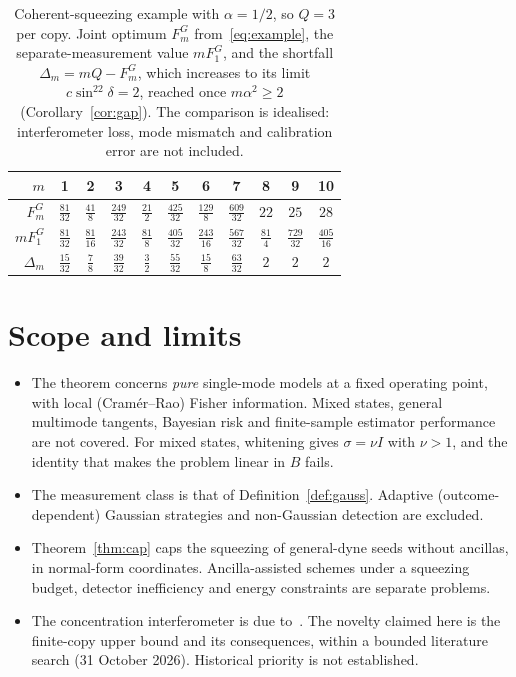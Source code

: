 \documentclass[11pt,a4paper]{article}
\theoremstyle{definition}\newtheorem{definition}{Definition}
\theoremstyle{remark}\newtheorem{remark}{Remark}
\begin{document}
\begin{table}[ht]
\centering
\caption{Coherent-squeezing example with $\alpha=1/2$, so $Q=3$ per copy. Joint optimum $F_m^G$ from~\eqref{eq:example}, the separate-measurement value $mF_1^G$, and the shortfall $\Delta_m=mQ-F_m^G$, which increases to its limit $c\sin^22\delta=2$, reached once $m\alpha^2\ge2$ (Corollary~\ref{cor:gap}). The comparison is idealised: interferometer loss, mode mismatch and calibration error are not included.}
\label{tab:example}
\begin{tabular}{rcccccccccc}
\toprule
$m$&1&2&3&4&5&6&7&8&9&10\\
\midrule
$F_m^G$&$\tfrac{81}{32}$&$\tfrac{41}{8}$&$\tfrac{249}{32}$&$\tfrac{21}{2}$&$\tfrac{425}{32}$&$\tfrac{129}{8}$&$\tfrac{609}{32}$&$22$&$25$&$28$\\[2pt]
$mF_1^G$&$\tfrac{81}{32}$&$\tfrac{81}{16}$&$\tfrac{243}{32}$&$\tfrac{81}{8}$&$\tfrac{405}{32}$&$\tfrac{243}{16}$&$\tfrac{567}{32}$&$\tfrac{81}{4}$&$\tfrac{729}{32}$&$\tfrac{405}{16}$\\[2pt]
$\Delta_m$&$\tfrac{15}{32}$&$\tfrac{7}{8}$&$\tfrac{39}{32}$&$\tfrac{3}{2}$&$\tfrac{55}{32}$&$\tfrac{15}{8}$&$\tfrac{63}{32}$&$2$&$2$&$2$\\
\bottomrule
\end{tabular}
\end{table}

\section{Scope and limits}\label{sec:scope}
\begin{itemize}
\item The theorem concerns \emph{pure} single-mode models at a fixed operating point, with local (Cram\'er--Rao) Fisher information. Mixed states, general multimode tangents, Bayesian risk and finite-sample estimator performance are not covered. For mixed states, whitening gives $\sigma=\nu I$ with $\nu>1$, and the identity that makes the problem linear in $B$ fails.
\item The measurement class is that of Definition~\ref{def:gauss}. Adaptive (outcome-dependent) Gaussian strategies and non-Gaussian detection are excluded.
\item Theorem~\ref{thm:cap} caps the squeezing of general-dyne seeds without ancillas, in normal-form coordinates. Ancilla-assisted schemes under a squeezing budget, detector inefficiency and energy constraints are separate problems.
\item The concentration interferometer is due to~\cite{Navarro2025}. The novelty claimed here is the finite-copy upper bound and its consequences, within a bounded literature search (31 October 2026). Historical priority is not established.
\end{itemize}
\end{document}
